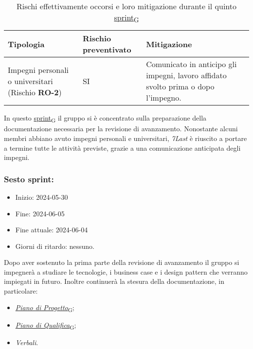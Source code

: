  \begin{table}[!h]
     \centering
     \begin{tabular}{ | p{6cm} | p{2.5cm} | p{7.5cm} | }
         \hline
         \textbf{Tipologia} & \textbf{Rischio preventivato} & \textbf{Mitigazione}  \\
         \hline
         Impegni personali o universitari (Rischio \textbf{RO-2})& SI & Comunicato in anticipo gli impegni, lavoro affidato svolto prima o dopo l'impegno.\\
         \hline
     \end{tabular}
     \caption{Rischi effettivamente occorsi e loro mitigazione durante il quinto \href{https://7last.github.io/docs/rtb/documentazione-interna/glossario\#sprint}{sprint\textsubscript{G}}} %

 \end{table}

In questo \href{https://7last.github.io/docs/rtb/documentazione-interna/glossario\#sprint}{sprint\textsubscript{G}} il gruppo si è concentrato sulla preparazione della documentazione necessaria per la revisione
di avanzamento.
Nonostante alcuni membri abbiano avuto impegni personali e universitari, \textit{7Last} è riuscito a portare a termine
tutte le attività previste, grazie a una comunicazione anticipata degli impegni.\\


\newpage
\subsubsection{Sesto sprint:}
\begin{itemize}
	\item Inizio: 2024-05-30
	\item Fine: 2024-06-05
	\item Fine attuale: 2024-06-04
	\item Giorni di ritardo: nessuno.
\end{itemize}

Dopo aver sostenuto la prima parte della revisione di avanzamento il gruppo si impegnerà a studiare le tecnologie, i business case e i design pattern che verranno impiegati in futuro.
Inoltre continuerà la stesura della documentazione, in particolare:
\begin{itemize}
	\item \href{https://7last.github.io/docs/rtb/documentazione-interna/glossario\#piano-di-progetto}{\textit{Piano di Progetto}\textsubscript{G}};
	\item \href{https://7last.github.io/docs/rtb/documentazione-interna/glossario\#piano-di-qualifica}{\textit{Piano di Qualifica}\textsubscript{G}};
	\item \textit{Verbali}.
\end{itemize}

